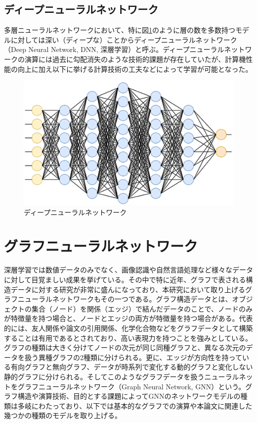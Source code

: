 \subsection{ディープニューラルネットワーク}
多層ニューラルネットワークにおいて、特に図\ref{dnn}のように層の数を多数持つモデルに対しては深い（ディープな）ことからディープニューラルネットワーク（Deep Neural Network, DNN, 深層学習）と呼ぶ。ディープニューラルネットワークの演算には過去に勾配消失のような技術的課題が存在していたが、計算機性能の向上に加え以下に挙げる計算技術の工夫などによって学習が可能となった。
\begin{figure}[h]
	\begin{center}
 \includegraphics[keepaspectratio, scale=0.4]
 	{Figure/Deeplearning/dnn.png}
 		\caption{ディープニューラルネットワーク}
 		\label{dnn}
	\end{center}
\end{figure}
\section{グラフニューラルネットワーク}
深層学習では数値データのみでなく、画像認識や自然言語処理など様々なデータに対して目覚ましい成果を挙げている。その中で特に近年、グラフで表される構造データに対する研究が非常に盛んになっており、本研究において取り上げるグラフニューラルネットワークもその一つである。グラフ構造データとは、オブジェクトの集合（ノード）を関係（エッジ）で結んだデータのことで、ノードのみが特徴量を持つ場合と、ノードとエッジの両方が特徴量を持つ場合がある。代表的には、友人関係や論文の引用関係、化学化合物などをグラフデータとして構築することは有用であるとされており、高い表現力を持つことを強みとしている。グラフの種類は大きく分けてノードの次元が同じ同種グラフと、異なる次元のデータを扱う異種グラフの2種類に分けられる。更に、エッジが方向性を持っている有向グラフと無向グラフ、データが時系列で変化する動的グラフと変化しない静的グラフに分けられる。そしてこのようなグラフデータを扱うニューラルネットをグラフニューラルネットワーク（Graph Neural Network, GNN）という。グラフ構造や演算技術、目的とする課題によってGNNのネットワークモデルの種類は多岐にわたっており、以下では基本的なグラフでの演算や本論文に関連した幾つかの種類のモデルを取り上げる。\\
